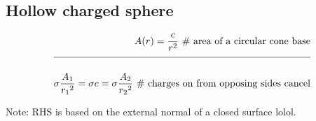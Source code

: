 \documentclass[a4paper]{article}
\newcommand{\eqComment}[1]{\text{  \# #1}}
\newcommand{\n}{\\[1.5ex] \hline \nonumber \\[0ex]}
\begin{document}
\subsection{Hollow charged sphere}
\begin{tcolorbox}
\begin{align} %
   A(r) = \frac{c}{r^2} \eqComment{area of a circular cone base}
\n \sigma \frac{A_1}{{r_1}^2} = \sigma c = \sigma \frac{A_2}{{r_2}^2} \eqComment{charges on from opposing sides cancel}
\end{align}
\end{tcolorbox}


Note: RHS is based on the external normal of a closed surface lolol.


\end{document}
